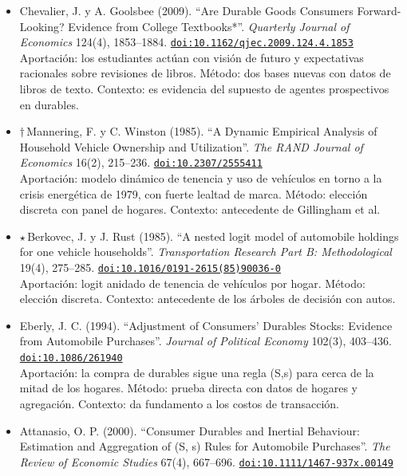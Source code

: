 \documentclass[11pt]{article}
\begin{document}
\begin{itemize}
Aportación: panorama de demanda dinámica y juegos dinámicos. Método: revisión. Contexto: enlaza este nido con la oferta dinámica del nido 5.
\item Chevalier, J. y A. Goolsbee (2009). ``Are Durable Goods Consumers Forward-Looking? Evidence from College Textbooks*''. \textit{Quarterly Journal of Economics} 124(4), 1853--1884. \href{https://doi.org/10.1162/qjec.2009.124.4.1853}{\texttt{doi:10.1162/qjec.2009.124.4.1853}}\\
Aportación: los estudiantes actúan con visión de futuro y expectativas racionales sobre revisiones de libros. Método: dos bases nuevas con datos de libros de texto. Contexto: es evidencia del supuesto de agentes prospectivos en durables.
\item $\dagger$\,Mannering, F. y C. Winston (1985). ``A Dynamic Empirical Analysis of Household Vehicle Ownership and Utilization''. \textit{The RAND Journal of Economics} 16(2), 215--236. \href{https://doi.org/10.2307/2555411}{\texttt{doi:10.2307/2555411}}\\
Aportación: modelo dinámico de tenencia y uso de vehículos en torno a la crisis energética de 1979, con fuerte lealtad de marca. Método: elección discreta con panel de hogares. Contexto: antecedente de Gillingham et al.
\item $\star$\,Berkovec, J. y J. Rust (1985). ``A nested logit model of automobile holdings for one vehicle households''. \textit{Transportation Research Part B: Methodological} 19(4), 275--285. \href{https://doi.org/10.1016/0191-2615(85)90036-0}{\texttt{doi:10.1016/0191-2615(85)90036-0}}\\
Aportación: logit anidado de tenencia de vehículos por hogar. Método: elección discreta. Contexto: antecedente de los árboles de decisión con autos.
\item Eberly, J. C. (1994). ``Adjustment of Consumers' Durables Stocks: Evidence from Automobile Purchases''. \textit{Journal of Political Economy} 102(3), 403--436. \href{https://doi.org/10.1086/261940}{\texttt{doi:10.1086/261940}}\\
Aportación: la compra de durables sigue una regla (S,s) para cerca de la mitad de los hogares. Método: prueba directa con datos de hogares y agregación. Contexto: da fundamento a los costos de transacción.
\item Attanasio, O. P. (2000). ``Consumer Durables and Inertial Behaviour: Estimation and Aggregation of (S, s) Rules for Automobile Purchases''. \textit{The Review of Economic Studies} 67(4), 667--696. \href{https://doi.org/10.1111/1467-937x.00149}{\texttt{doi:10.1111/1467-937x.00149}}\\

\end{itemize}
\end{document}
